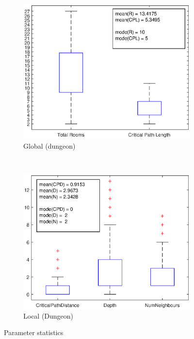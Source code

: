\documentclass{UoYCSproject}
\begin{document}
\begin{figure}[htb]
  \centering
  \begin{subfigure}[b]{0.60\textwidth}
    \centering
    \includegraphics[width=\textwidth]{figures/data_plots/dungeon_bp.eps}
    \caption{Global (dungeon)}
  \end{subfigure}
  ~
  \begin{subfigure}[b]{0.60\textwidth}
    \centering
    \includegraphics[width=\textwidth]{figures/data_plots/room_bp.eps}
    \caption{Local (Dungeon)}
  \end{subfigure}
  \caption{Parameter statistics}
  \label{fig:dataStats}
\end{figure}
\end{document}
